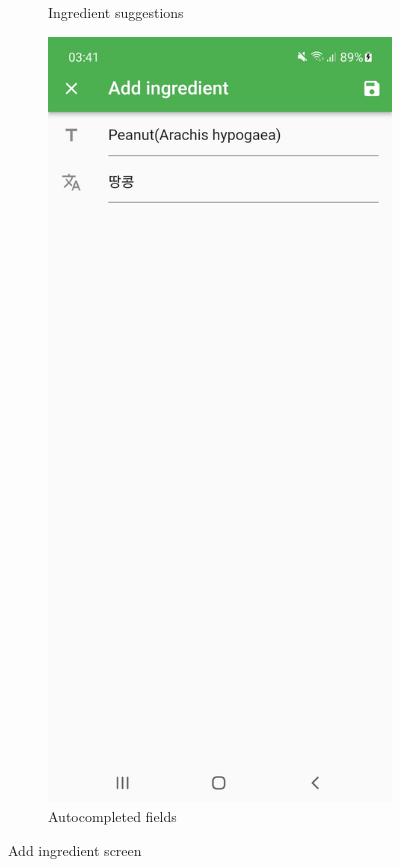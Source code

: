 \begin{figure}[h]
\begin{subfigure}{0.5\textwidth}
        \caption{Ingredient suggestions}
        \label{fig:ingredients-autocomplete}
    \end{subfigure}
    \begin{subfigure}{0.5\textwidth}
        \centering
        \includegraphics[width=0.9\linewidth]{Figures/Screenshot/ingredients_add.jpg}
        \caption{Autocompleted fields}
        \label{fig:ingredients-add}
    \end{subfigure}
    \caption{Add ingredient screen}
    \label{fig:ingredients2}
\end{figure}

\clearpage